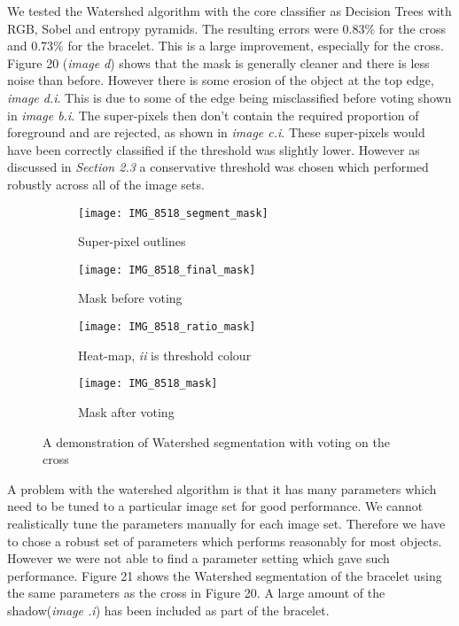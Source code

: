 \documentclass[12pt]{IIBproject}
\begin{document}
We tested the Watershed algorithm with the core classifier as Decision Trees with RGB, Sobel and entropy pyramids. The resulting errors were 0.83\% for the cross and 0.73\% for the bracelet. This is a large improvement, especially for the cross. Figure 20 (\emph{image d}) shows that the mask is generally cleaner and there is less noise than before. However there is some erosion of the object at the top edge, \emph{image d.i}. This is due to some of the edge being misclassified before voting shown in \emph{image b.i}. The super-pixels then don't contain the required proportion of foreground and are rejected, as shown in \emph{image c.i}. These super-pixels would have been correctly classified if the threshold was slightly lower. However as discussed in \emph{Section 2.3} a conservative threshold was chosen which performed robustly across all of the image sets.
\begin{figure}[H]
\centering
\begin{subfigure}{.45\textwidth}
  \centering
  \texttt{[image: IMG\_8518\_segment\_mask]}
  \caption{Super-pixel outlines}
  \label{fig:sub1}
\end{subfigure}%
\begin{subfigure}{.45\textwidth}
  \centering
  \texttt{[image: IMG\_8518\_final\_mask]}
  \caption{Mask before voting}
  \label{fig:sub2}
\end{subfigure}
\begin{subfigure}{.45\textwidth}
  \centering
  \texttt{[image: IMG\_8518\_ratio\_mask]}
  \caption{Heat-map, \emph{ii} is threshold colour}
  \label{fig:sub2}
\end{subfigure}
\begin{subfigure}{.45\textwidth}
  \centering
  \texttt{[image: IMG\_8518\_mask]}
  \caption{Mask after voting}
  \label{fig:sub2}
\end{subfigure}
\caption{A demonstration of Watershed segmentation with voting on the cross}
\label{fig:test}
\end{figure}


A problem with the watershed algorithm is that it has many parameters which need to be tuned to a particular image set for good performance. We cannot realistically tune the parameters manually for each image set. Therefore we have to chose a robust set of parameters which performs reasonably for most objects. However we were not able to find a parameter setting which gave such performance. Figure 21 shows the Watershed segmentation of the bracelet using the same parameters as the cross in Figure 20. A large amount of the shadow(\emph{image .i}) has been included as part of the bracelet.
\end{document}
